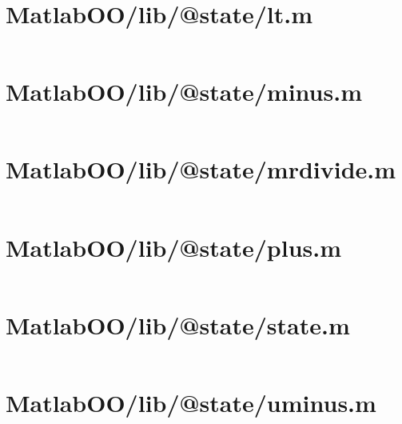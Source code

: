 \section*{MatlabOO/lib/@state/lt.m}\label{code:MatlabOO/lib/@state/lt.m}
\inputminted[linenos,fontsize=\scriptsize]{matlab}{/home/dcouture/git/mathyourlife/TSatPy/beta_versions/matlab_object_oriented/lib/@state/lt.m}

\pagebreak
\section*{MatlabOO/lib/@state/minus.m}\label{code:MatlabOO/lib/@state/minus.m}
\inputminted[linenos,fontsize=\scriptsize]{matlab}{/home/dcouture/git/mathyourlife/TSatPy/beta_versions/matlab_object_oriented/lib/@state/minus.m}

\pagebreak
\section*{MatlabOO/lib/@state/mrdivide.m}\label{code:MatlabOO/lib/@state/mrdivide.m}
\inputminted[linenos,fontsize=\scriptsize]{matlab}{/home/dcouture/git/mathyourlife/TSatPy/beta_versions/matlab_object_oriented/lib/@state/mrdivide.m}

\pagebreak
\section*{MatlabOO/lib/@state/plus.m}\label{code:MatlabOO/lib/@state/plus.m}
\inputminted[linenos,fontsize=\scriptsize]{matlab}{/home/dcouture/git/mathyourlife/TSatPy/beta_versions/matlab_object_oriented/lib/@state/plus.m}

\pagebreak
\section*{MatlabOO/lib/@state/state.m}\label{code:MatlabOO/lib/@state/state.m}
\inputminted[linenos,fontsize=\scriptsize]{matlab}{/home/dcouture/git/mathyourlife/TSatPy/beta_versions/matlab_object_oriented/lib/@state/state.m}

\pagebreak
\section*{MatlabOO/lib/@state/uminus.m}\label{code:MatlabOO/lib/@state/uminus.m}
\inputminted[linenos,fontsize=\scriptsize]{matlab}{/home/dcouture/git/mathyourlife/TSatPy/beta_versions/matlab_object_oriented/lib/@state/uminus.m}

